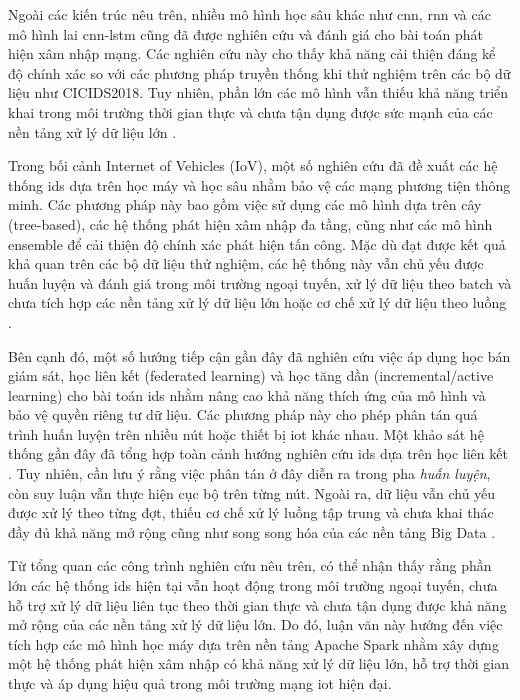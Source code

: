 Ngoài các kiến trúc nêu trên, nhiều mô hình học sâu khác như \ac{cnn}, \ac{rnn} và các mô hình lai \ac{cnn}-\ac{lstm} cũng đã được nghiên cứu và đánh giá cho bài toán phát hiện xâm nhập mạng. Các nghiên cứu này cho thấy khả năng cải thiện đáng kể độ chính xác so với các phương pháp truyền thống khi thử nghiệm trên các bộ dữ liệu như CICIDS2018. Tuy nhiên, phần lớn các mô hình vẫn thiếu khả năng triển khai trong môi trường thời gian thực và chưa tận dụng được sức mạnh của các nền tảng xử lý dữ liệu lớn \cite{sensors2023}.

Trong bối cảnh Internet of Vehicles (IoV), một số nghiên cứu đã đề xuất các hệ thống \ac{ids} dựa trên học máy và học sâu nhằm bảo vệ các mạng phương tiện thông minh. Các phương pháp này bao gồm việc sử dụng các mô hình dựa trên cây (tree-based), các hệ thống phát hiện xâm nhập đa tầng, cũng như các mô hình ensemble để cải thiện độ chính xác phát hiện tấn công. Mặc dù đạt được kết quả khả quan trên các bộ dữ liệu thử nghiệm, các hệ thống này vẫn chủ yếu được huấn luyện và đánh giá trong môi trường ngoại tuyến, xử lý dữ liệu theo batch và chưa tích hợp các nền tảng xử lý dữ liệu lớn hoặc cơ chế xử lý dữ liệu theo luồng \cite{yang2019,yang2022a,yang2022b}.

Bên cạnh đó, một số hướng tiếp cận gần đây đã nghiên cứu việc áp dụng học bán giám sát, học liên kết (federated learning) và học tăng dần (incremental/active learning) cho bài toán \ac{ids} nhằm nâng cao khả năng thích ứng của mô hình và bảo vệ quyền riêng tư dữ liệu. Các phương pháp này cho phép phân tán quá trình huấn luyện trên nhiều nút hoặc thiết bị \ac{iot} khác nhau. Một khảo sát hệ thống gần đây đã tổng hợp toàn cảnh hướng nghiên cứu \ac{ids} dựa trên học liên kết \cite{hernandezramos2025federated}. Tuy nhiên, cần lưu ý rằng việc phân tán ở đây diễn ra trong pha \emph{huấn luyện}, còn suy luận vẫn thực hiện cục bộ trên từng nút. Ngoài ra, dữ liệu vẫn chủ yếu được xử lý theo từng đợt, thiếu cơ chế xử lý luồng tập trung và chưa khai thác đầy đủ khả năng mở rộng cũng như song song hóa của các nền tảng Big Data \cite{baidar2025,williams2025,albanbay2025,nguyen2019diot,boukela2021}.

Từ tổng quan các công trình nghiên cứu nêu trên, có thể nhận thấy rằng phần lớn các hệ thống \ac{ids} hiện tại vẫn hoạt động trong môi trường ngoại tuyến, chưa hỗ trợ xử lý dữ liệu liên tục theo thời gian thực và chưa tận dụng được khả năng mở rộng của các nền tảng xử lý dữ liệu lớn. Do đó, luận văn này hướng đến việc tích hợp các mô hình học máy dựa trên nền tảng Apache Spark nhằm xây dựng một hệ thống phát hiện xâm nhập có khả năng xử lý dữ liệu lớn, hỗ trợ thời gian thực và áp dụng hiệu quả trong môi trường mạng \ac{iot} hiện đại.

